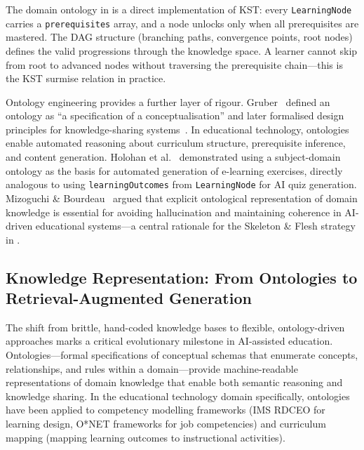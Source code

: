 The domain ontology in \projectname{} is a direct implementation of KST: every \texttt{LearningNode} carries a \texttt{prerequisites} array, and a node unlocks only when all prerequisites are mastered. The DAG structure (branching paths, convergence points, root nodes) defines the valid progressions through the knowledge space. A learner cannot skip from root to advanced nodes without traversing the prerequisite chain---this is the KST surmise relation in practice.

Ontology engineering provides a further layer of rigour. Gruber~\cite{gruber1993} defined an ontology as \enquote{a specification of a conceptualisation} and later formalised design principles for knowledge-sharing systems~\cite{gruber1995}. In educational technology, ontologies enable automated reasoning about curriculum structure, prerequisite inference, and content generation. Holohan et al.~\cite{holohan2005} demonstrated using a subject-domain ontology as the basis for automated generation of e-learning exercises, directly analogous to using \texttt{learningOutcomes} from \texttt{LearningNode} for AI quiz generation. Mizoguchi \& Bourdeau~\cite{mizoguchi2000} argued that explicit ontological representation of domain knowledge is essential for avoiding hallucination and maintaining coherence in AI-driven educational systems---a central rationale for the Skeleton \& Flesh strategy in \projectname.

\subsection{Knowledge Representation: From Ontologies to Retrieval-Augmented Generation}
\label{sec:knowledge-repr}

The shift from brittle, hand-coded knowledge bases to flexible, ontology-driven approaches marks a critical evolutionary milestone in AI-assisted education. Ontologies---formal specifications of conceptual schemas that enumerate concepts, relationships, and rules within a domain---provide machine-readable representations of domain knowledge that enable both semantic reasoning and knowledge sharing. In the educational technology domain specifically, ontologies have been applied to competency modelling frameworks (IMS RDCEO for learning design, O*NET frameworks for job competencies) and curriculum mapping (mapping learning outcomes to instructional activities).

